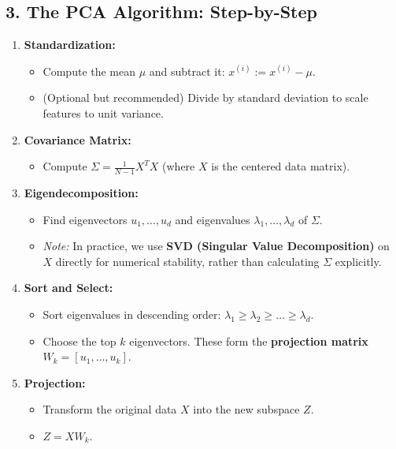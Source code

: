 \documentclass[
  italian,
  11pt,
]{article}
\providecommand{\tightlist}{%
  \setlength{\itemsep}{0pt}\setlength{\parskip}{0pt}}
\begin{document}
\subsection{3. The PCA Algorithm:
Step-by-Step}\label{the-pca-algorithm-step-by-step}

\begin{enumerate}
\def\labelenumi{\arabic{enumi}.}
\item
  \textbf{Standardization:}

  \begin{itemize}
  \item
    Compute the mean \(\mu\) and subtract it:
    \(x^{(i)} := x^{(i)} - \mu\).
  \item
    (Optional but recommended) Divide by standard deviation to scale
    features to unit variance.
  \end{itemize}
\item
  \textbf{Covariance Matrix:}

  \begin{itemize}
  \tightlist
  \item
    Compute \(\Sigma = \frac{1}{N-1} X^T X\) (where \(X\) is the
    centered data matrix).
  \end{itemize}
\item
  \textbf{Eigendecomposition:}

  \begin{itemize}
  \item
    Find eigenvectors \(u_1, \dots, u_d\) and eigenvalues
    \(\lambda_1, \dots, \lambda_d\) of \(\Sigma\).
  \item
    \emph{Note:} In practice, we use \textbf{SVD (Singular Value
    Decomposition)} on \(X\) directly for numerical stability, rather
    than calculating \(\Sigma\) explicitly.
  \end{itemize}
\item
  \textbf{Sort and Select:}

  \begin{itemize}
  \item
    Sort eigenvalues in descending order:
    \(\lambda_1 \geq \lambda_2 \geq \dots \geq \lambda_d\).
  \item
    Choose the top \(k\) eigenvectors. These form the \textbf{projection
    matrix} \(W_k = [u_1, \dots, u_k]\).
  \end{itemize}
\item
  \textbf{Projection:}

  \begin{itemize}
  \item
    Transform the original data \(X\) into the new subspace \(Z\).
  \item
    \(Z = X W_k\).
  \end{itemize}
\end{enumerate}
\end{document}
